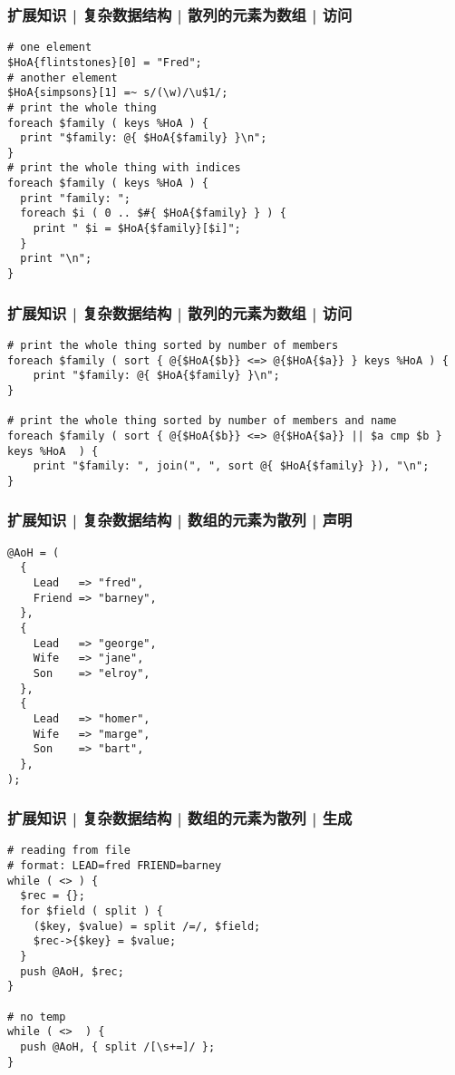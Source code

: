 \begin{frame}[fragile]
  \frametitle{扩展知识 | 复杂数据结构 | 散列的元素为数组 | 访问}
\begin{lstlisting}
# one element
$HoA{flintstones}[0] = "Fred";
# another element
$HoA{simpsons}[1] =~ s/(\w)/\u$1/;
# print the whole thing
foreach $family ( keys %HoA ) {
  print "$family: @{ $HoA{$family} }\n";
}
# print the whole thing with indices
foreach $family ( keys %HoA ) {
  print "family: ";
  foreach $i ( 0 .. $#{ $HoA{$family} } ) {
    print " $i = $HoA{$family}[$i]";
  }
  print "\n";
}
\end{lstlisting}
\end{frame}

\begin{frame}[fragile]
  \frametitle{扩展知识 | 复杂数据结构 | 散列的元素为数组 | 访问}
\begin{lstlisting}
# print the whole thing sorted by number of members
foreach $family ( sort { @{$HoA{$b}} <=> @{$HoA{$a}} } keys %HoA ) {
    print "$family: @{ $HoA{$family} }\n";
}

# print the whole thing sorted by number of members and name
foreach $family ( sort { @{$HoA{$b}} <=> @{$HoA{$a}} || $a cmp $b } keys %HoA  ) {
    print "$family: ", join(", ", sort @{ $HoA{$family} }), "\n";
}
\end{lstlisting}
\end{frame}

\begin{frame}[fragile]
  \frametitle{扩展知识 | 复杂数据结构 | 数组的元素为散列 | 声明}
\begin{lstlisting}
@AoH = (
  {
    Lead   => "fred",
    Friend => "barney",
  },
  {
    Lead   => "george",
    Wife   => "jane",
    Son    => "elroy",
  },
  {
    Lead   => "homer",
    Wife   => "marge",
    Son    => "bart",
  },
);
\end{lstlisting}
\end{frame}

\begin{frame}[fragile]
  \frametitle{扩展知识 | 复杂数据结构 | 数组的元素为散列 | 生成}
\begin{lstlisting}
# reading from file
# format: LEAD=fred FRIEND=barney
while ( <> ) {
  $rec = {};
  for $field ( split ) {
    ($key, $value) = split /=/, $field;
    $rec->{$key} = $value;
  }
  push @AoH, $rec;
}

# no temp
while ( <>  ) {
  push @AoH, { split /[\s+=]/ };
}
\end{lstlisting}
\end{frame}

